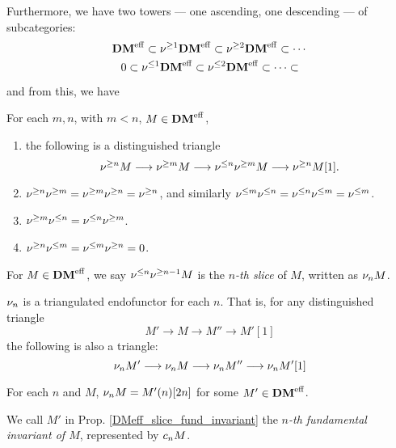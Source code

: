 Furthermore, we have two towers --- one ascending, one descending 
--- of subcategories:
\begin{equation}
\mathbf{DM}^{\mathrm{eff}} \subset \nu^{\geq 1}\mathbf{DM}^{\mathrm{eff}} \subset \nu^{\geq 2}\mathbf{DM}^{\mathrm{eff}} \subset \cdots \\
\end{equation}
\vskip 5pt
\begin{equation}
0 \subset \nu^{\leq 1}\mathbf{DM}^{\mathrm{eff}} \subset \nu^{\leq 2}\mathbf{DM}^{\mathrm{eff}} \subset \cdots \subset
\end{equation}

and from this, we have

\begin{prop}
For each $m, n$, with $m < n$, $M \in \mathbf{DM}^{\mathrm{eff}}$,

\begin{enumerate}
\item the following is a distinguished triangle
\begin{equation}
\nu^{\geq n}M \longrightarrow \nu^{\geq m}M \longrightarrow \nu^{\leq n}\nu^{\geq m}M \longrightarrow \nu^{\geq n}M[1].
\end{equation}

\item $\nu^{\geq n}\nu^{\geq m} = \nu^{\geq m}\nu^{\geq n} = \nu^{\geq n}$, and 
similarly $\nu^{\leq m}\nu^{\leq n} = \nu^{\leq n}\nu^{\leq m} = \nu^{\leq m}$.

\item $\nu^{\geq m}\nu^{\leq n} = \nu^{\leq n}\nu^{\geq m}$.

\item $\nu^{\geq n}\nu^{\leq m} = \nu^{\leq m}\nu^{\geq n} = 0$.
\end{enumerate}
\end{prop}

\begin{defn}
For $M \in \mathbf{DM}^{\mathrm{eff}}$, we say $\nu^{\leq n}\nu^{\geq n - 1}M$ is the 
\emph{$n$-th slice} of $M$, written as $\nu_{n}M$.
\end{defn}

\begin{prop}
$\nu_{n}$ is a triangulated endofunctor for each $n$. That is,
for any distinguished triangle
\[
M' \to M \to M'' \to M'[1]
\]
the following is also a triangle:
\[
\nu_{n}M' \longrightarrow \nu_{n}M \longrightarrow \nu_{n}M'' \longrightarrow \nu_{n}M'[1]
\]
\end{prop}

\begin{prop}\label{DMeff_slice_fund_invariant}
For each $n$ and $M$, $\nu_{n}M = M'(n)[2n]$ for some $M' \in
\mathbf{DM}^{\mathrm{eff}}$.
\end{prop}

\begin{defn}
We call $M'$ in Prop. \ref{DMeff_slice_fund_invariant} the 
\emph{$n$-th fundamental invariant of $M$}, represented by
$c_{n}M$.
\end{defn}

